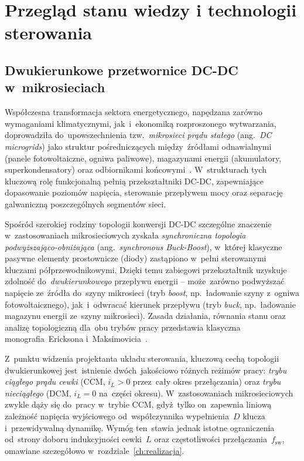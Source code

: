 \chapter{Przegląd stanu wiedzy i technologii sterowania}
\label{ch:analiza}


\section{Dwukierunkowe przetwornice DC-DC w~mikrosieciach}
\label{sec:przetwornice}

Współczesna transformacja sektora energetycznego, napędzana zarówno wymaganiami klimatycznymi, jak~i~ekonomiką rozproszonego wytwarzania, doprowadziła do~upowszechnienia tzw.~\emph{mikrosieci prądu stałego} (ang.~\emph{DC microgrids}) jako struktur pośredniczących między~źródłami odnawialnymi (panele fotowoltaiczne, ogniwa paliwowe), magazynami energii (akumulatory, superkondensatory) oraz odbiornikami końcowymi~\cite{dragicevic2016}. W~strukturach tych kluczową rolę funkcjonalną pełnią przekształtniki DC-DC, zapewniające dopasowanie poziomów napięcia, sterowanie przepływem mocy oraz separację galwaniczną poszczególnych segmentów sieci.

Spośród szerokiej rodziny topologii konwersji DC-DC szczególne znaczenie w~zastosowaniach mikrosieciowych zyskała \emph{synchroniczna topologia podwyższająco-obniżająca} (ang.~\emph{synchronous Buck-Boost}), w~której klasyczne pasywne elementy prostownicze (diody) zastąpiono w~pełni sterowanymi kluczami półprzewodnikowymi. Dzięki temu zabiegowi przekształtnik uzyskuje zdolność do~\emph{dwukierunkowego} przepływu energii -- może~zarówno podwyższać napięcie ze~źródła do~szyny mikrosieci (tryb \emph{boost}, np.~ładowanie szyny z~ogniwa fotowoltaicznego), jak~i~odwracać kierunek przepływu (tryb \emph{buck}, np.~ładowanie magazynu energii ze~szyny mikrosieci). Zasada działania, równania stanu oraz analizę topologiczną dla~obu trybów pracy przedstawia klasyczna monografia~Ericksona i~Maksimovicia~\cite{erickson2020}.

Z~punktu widzenia projektanta układu sterowania, kluczową cechą topologii dwukierunkowej jest~istnienie dwóch~jakościowo różnych reżimów pracy: \emph{trybu ciągłego prądu cewki} (CCM, $i_L>0$ przez~cały okres przełączania) oraz \emph{trybu nieciągłego} (DCM, $i_L = 0$ na~części okresu). W~zastosowaniach mikrosieciowych zwykle dąży się do~pracy w~trybie CCM, gdyż~tylko on~zapewnia liniową zależność napięcia wyjściowego od~współczynnika wypełnienia~$D$ klucza i~przewidywalną dynamikę. Wymóg ten~stawia jednak istotne ograniczenia od~strony doboru indukcyjności cewki~$L$ oraz częstotliwości przełączania~$f_{\mathrm{sw}}$, omawiane szczegółowo w~rozdziale~\ref{ch:realizacja}.

